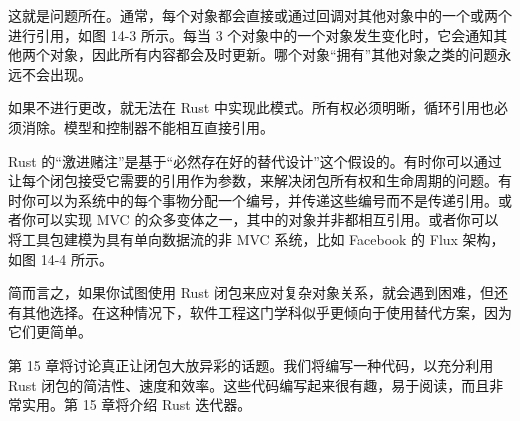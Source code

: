 这就是问题所在。通常，每个对象都会直接或通过回调对其他对象中的一个或两个进行引用，如图 14-3 所示。每当 3 个对象中的一个对象发生变化时，它会通知其他两个对象，因此所有内容都会及时更新。哪个对象“拥有”其他对象之类的问题永远不会出现。


如果不进行更改，就无法在 Rust 中实现此模式。所有权必须明晰，循环引用也必须消除。模型和控制器不能相互直接引用。

Rust 的“激进赌注”是基于“必然存在好的替代设计”这个假设的。有时你可以通过让每个闭包接受它需要的引用作为参数，来解决闭包所有权和生命周期的问题。有时你可以为系统中的每个事物分配一个编号，并传递这些编号而不是传递引用。或者你可以实现 MVC 的众多变体之一，其中的对象并非都相互引用。或者你可以将工具包建模为具有单向数据流的非 MVC 系统，比如 Facebook 的 Flux 架构，如图 14-4 所示。


简而言之，如果你试图使用 Rust 闭包来应对复杂对象关系，就会遇到困难，但还有其他选择。在这种情况下，软件工程这门学科似乎更倾向于使用替代方案，因为它们更简单。

第 15 章将讨论真正让闭包大放异彩的话题。我们将编写一种代码，以充分利用 Rust 闭包的简洁性、速度和效率。这些代码编写起来很有趣，易于阅读，而且非常实用。第 15 章将介绍 Rust 迭代器。

